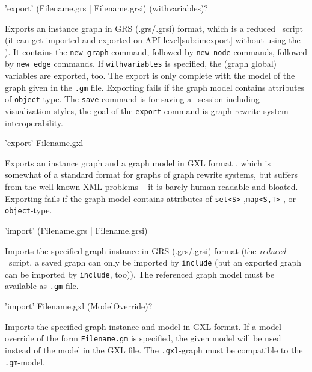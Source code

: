 \begin{rail}
  'export' (Filename.grs | Filename.grsi) (withvariables)?
\end{rail}
Exports an instance graph in GRS (.grs/.grsi) format, which is a reduced \GrShell\ script (it can get imported and exported on API level\ref{sub:imexport} without using the \GrShell).
It contains the \texttt{new graph} command, followed by \texttt{new node} commands, followed by \texttt{new edge} commands.
If \texttt{withvariables} is specified, the (graph global) variables are exported, too.
The export is only complete with the model of the graph given in the \texttt{.gm} file.
Exporting fails if the graph model contains attributes of \texttt{object}-type.
The \texttt{save} command is for saving a \GrShell\ session including visualization styles, the goal of the \texttt{export} command is graph rewrite system interoperability.

\begin{rail}
  'export' Filename.gxl
\end{rail}
Exports an instance graph and a graph model in GXL format \cite{GXL,GXL2}, which is somewhat of a standard format for graphs of graph rewrite systems, but suffers from the well-known XML problems -- it is barely human-readable and bloated.
Exporting fails if the graph model contains attributes of \texttt{set<S>}-,\texttt{map<S,T>}-, or \texttt{object}-type.

\begin{rail}
  'import' (Filename.grs | Filename.grsi)
\end{rail}
Imports the specified graph instance in GRS (.grs/.grsi) format (the \emph{reduced} \GrShell\ script,
a saved graph can only be imported by \texttt{include} (but an exported graph can be imported by \texttt{include}, too)).
The referenced graph model must be available as \texttt{.gm}-file.

\begin{rail}
  'import' Filename.gxl (ModelOverride)?
\end{rail}
Imports the specified graph instance and model in GXL format.
If a model override of the form \texttt{Filename.gm} is specified, the given model will be used instead of the model in the GXL file.
The \texttt{.gxl}-graph must be compatible to the \texttt{.gm}-model.

